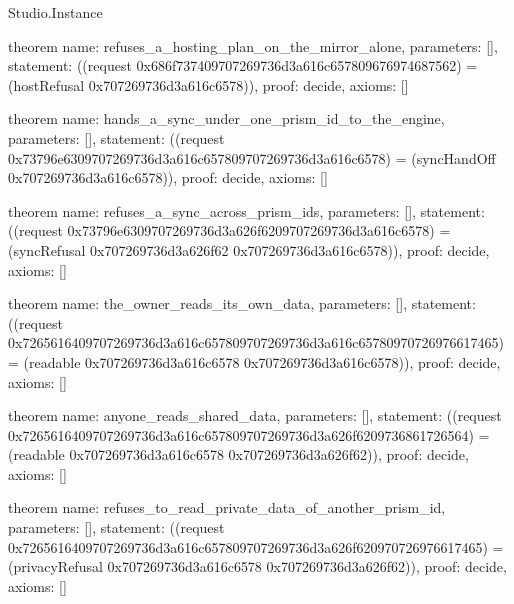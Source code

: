 \begin{lexlean}{Studio.Instance}
\begin{semanticmodule}
theorem{
  name: refuses_a_hosting_plan_on_the_mirror_alone,
  parameters: [],
  statement: ((request 0x686f737409707269736d3a616c657809676974687562) = (hostRefusal 0x707269736d3a616c6578)),
  proof: decide{},
  axioms: []
}

theorem{
  name: hands_a_sync_under_one_prism_id_to_the_engine,
  parameters: [],
  statement: ((request 0x73796e6309707269736d3a616c657809707269736d3a616c6578) = (syncHandOff 0x707269736d3a616c6578)),
  proof: decide{},
  axioms: []
}

theorem{
  name: refuses_a_sync_across_prism_ids,
  parameters: [],
  statement: ((request 0x73796e6309707269736d3a626f6209707269736d3a616c6578) = (syncRefusal 0x707269736d3a626f62 0x707269736d3a616c6578)),
  proof: decide{},
  axioms: []
}

theorem{
  name: the_owner_reads_its_own_data,
  parameters: [],
  statement: ((request 0x7265616409707269736d3a616c657809707269736d3a616c65780970726976617465) = (readable 0x707269736d3a616c6578 0x707269736d3a616c6578)),
  proof: decide{},
  axioms: []
}

theorem{
  name: anyone_reads_shared_data,
  parameters: [],
  statement: ((request 0x7265616409707269736d3a616c657809707269736d3a626f6209736861726564) = (readable 0x707269736d3a616c6578 0x707269736d3a626f62)),
  proof: decide{},
  axioms: []
}

theorem{
  name: refuses_to_read_private_data_of_another_prism_id,
  parameters: [],
  statement: ((request 0x7265616409707269736d3a616c657809707269736d3a626f620970726976617465) = (privacyRefusal 0x707269736d3a616c6578 0x707269736d3a626f62)),
  proof: decide{},
  axioms: []
}
\end{semanticmodule}
\end{lexlean}
